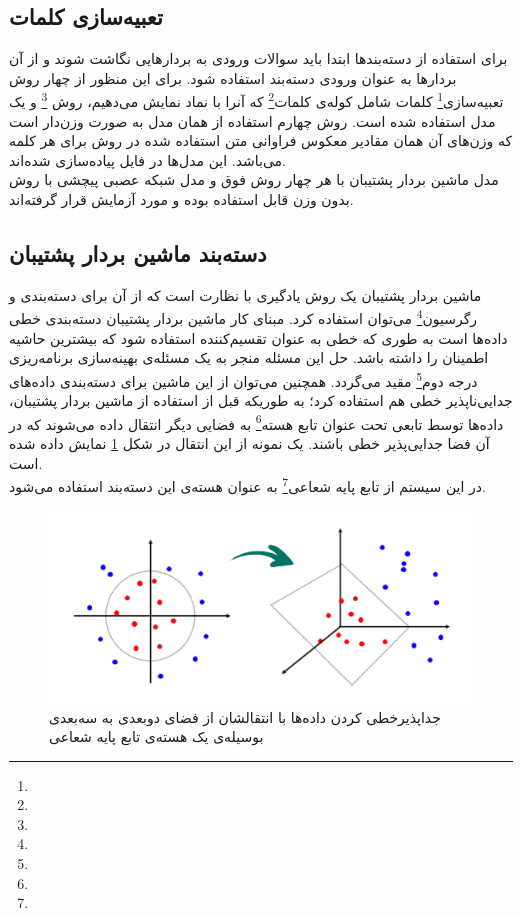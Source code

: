 \subsection{‌تعبیه‌سازی کلمات}
برای استفاده از دسته‌بندها ابتدا باید سوالات ورودی به بردارهایی نگاشت شوند و از آن بردارها به عنوان ورودی دسته‌بند استفاده شود. برای این منظور از چهار روش تعبیه‌سازی\footnote{} کلمات شامل کوله‌ی کلمات\footnote{} که آنرا با نماد  نمایش می‌دهیم، روش \footnote{} و یک مدل  استفاده شده است. روش چهارم استفاده از همان مدل  به صورت وزن‌دار است که وزن‌های آن همان مقادیر معکوس فراوانی متن استفاده شده در روش  برای هر کلمه می‌باشد.
این مدل‌ها در فایل  پیاده‌سازی شده‌اند. \\
مدل ماشین بردار پشتیبان با هر چهار روش فوق و مدل شبکه عصبی پیچشی با روش  بدون وزن قابل استفاده بوده و مورد آزمایش قرار گرفته‌اند.

\subsection{دسته‌بند ماشین بردار پشتیبان‌‌}
ماشین بردار پشتیبان یک روش یادگیری با نظارت است که از آن برای دسته‌بندی و رگرسیون\footnote{} می‌توان استفاده کرد. مبنای کار ماشین بردار پشتیبان دسته‌بندی خطی داده‌ها است به طوری که خطی به عنوان تقسیم‌کننده استفاده شود که بیشترین حاشیه اطمینان را داشته باشد. حل این مسئله منجر به یک مسئله‌ی بهینه‌سازی برنامه‌ریزی درجه دوم\footnote{} مقید می‌گردد.
همچنین می‌توان از این ماشین برای دسته‌بندی داده‌های جدایی‌ناپذیر خطی هم استفاده کرد؛ به طوریکه قبل از استفاده از ماشین بردار پشتیبان، داده‌ها توسط تابعی تحت عنوان تابع هسته\footnote{} به فضایی دیگر انتقال داده می‌شوند که در آن فضا جدایی‌پذیر خطی باشند. یک نمونه از این انتقال در شکل \ref{fig:svm-kernel} نمایش داده شده‌ است.\\
در این سیستم از تابع پایه شعاعی\footnote{} به عنوان هسته‌ی این دسته‌بند استفاده می‌شود.

\begin{figure}[t!]
	\centering
	\includegraphics[scale=0.25]{figures/svm-kernel.jpeg}
	\caption[تابع هسته‌ی دایره‌ای در ماشین بردار پشتیبان]{جداپذیرخطی کردن داده‌ها با انتقالشان از فضای دوبعدی به سه‌بعدی بوسیله‌ی یک هسته‌ی تابع پایه شعاعی}
	\label{fig:svm-kernel}
\end{figure}


